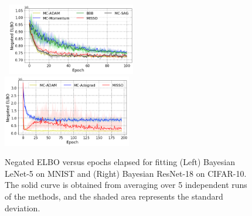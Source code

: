 \documentclass[final,12pt]{alt2022} %
\begin{document}
\begin{figure}[H]
    \begin{center}
    \mbox{\hspace{-0.1in}
        \includegraphics[width=0.5\textwidth]{figure/small_lenet.png}\hspace{-0.1in}
        \includegraphics[width=0.5\textwidth]{figure/small_resnet.png}
    }
    \end{center}
 \caption{Negated ELBO versus epochs elapsed for fitting (Left) Bayesian LeNet-5 on MNIST and (Right) Bayesian ResNet-18 on CIFAR-10. The solid curve is obtained from averaging over 5 independent runs of the methods, and the shaded area represents the standard deviation.}\label{fig:lenetoptepochs}
\end{figure}

 
% 
% 
%
%
\end{document}

